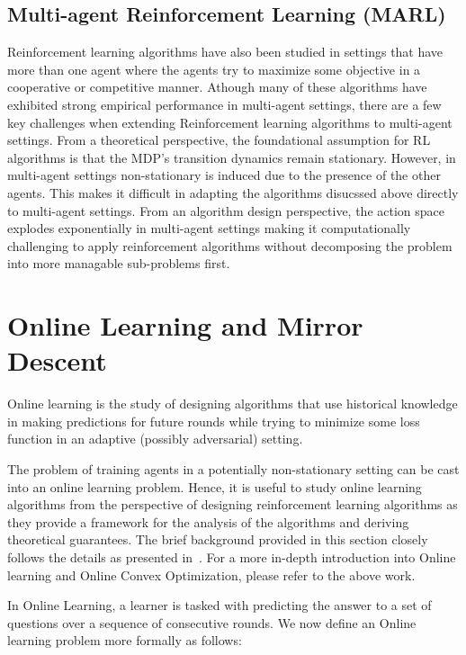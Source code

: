 \subsection{Multi-agent Reinforcement Learning (MARL)}\label{sec:marl}
Reinforcement learning algorithms have also been studied in settings that have more than one agent
where the agents try to maximize some objective in a cooperative or competitive manner.
Athough many of these algorithms have exhibited strong empirical performance in multi-agent
settings, there are a few key challenges when extending Reinforcement learning algorithms to
multi-agent settings.
From a theoretical perspective, the foundational assumption for RL algorithms is that the MDP's
transition dynamics remain stationary.
However, in multi-agent settings non-stationary is induced due to the presence of the other agents.
This makes it difficult in adapting the algorithms disucssed above directly to multi-agent
settings.
From an algorithm design perspective, the action space explodes exponentially in multi-agent
settings making it computationally challenging to apply reinforcement algorithms without
decomposing the problem into more managable sub-problems first.

\section{Online Learning and Mirror Descent}

Online learning is the study of designing algorithms that use historical knowledge in making
predictions for future rounds while trying to minimize some loss function in an adaptive (possibly
adversarial) setting.

The problem of training agents in a potentially non-stationary setting can be cast into an online
learning problem.
Hence, it is useful to study online learning algorithms from the perspective of designing
reinforcement learning algorithms as they provide a framework for the analysis of the algorithms
and deriving theoretical guarantees.
The brief background provided in this section closely follows the details as presented
in~\cite{shalev-shwartzOnline2012}.
For a more in-depth introduction into Online learning and Online Convex Optimization, please refer
to the above work.

In Online Learning, a learner is tasked with predicting the answer to a set of questions over a
sequence of consecutive rounds.
We now define an Online learning problem more formally as follows:

